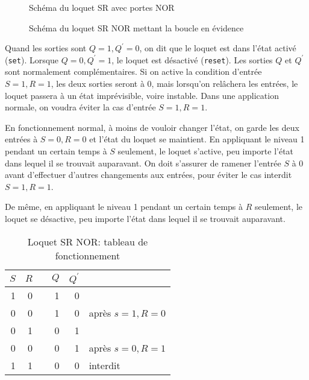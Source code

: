 \documentclass[11pt]{article}
\begin{document}
\begin{figure}[htbp]
\centering

\caption{\label{fig:orgfafe8a9}Schéma du loquet SR avec portes NOR}
\end{figure}


\begin{figure}[htbp]
\centering

\caption{\label{fig:org5976c67}Schéma du loquet SR NOR mettant la boucle en évidence}
\end{figure}

Quand les sorties sont \(Q=1, Q^\prime=0\), on dit que le loquet est
dans l'état activé (\texttt{set}). Lorsque \(Q=0, Q^\prime=1\), le loquet
est désactivé (\texttt{reset}). Les sorties \(Q\) et \(Q^\prime\) sont
normalement complémentaires. Si on active la condition d'entrée \(S=1,
R=1\), les deux sorties seront à 0, mais lorsqu'on relâchera les
entrées, le loquet passera à un état imprévisible, voire
instable. Dans une application normale, on voudra éviter la cas
d'entrée \(S=1, R=1\). 

En fonctionnement normal, à moins de vouloir changer l'état, on garde
les deux entrées à \(S=0, R=0\) et l'état du loquet se maintient. En
appliquant le niveau 1 pendant un certain temps à \(S\) seulement, le
loquet s'active, peu importe l'état dans lequel il se trouvait
auparavant. On doit s'assurer de ramener l'entrée \(S\) à 0 avant
d'effectuer d'autres changements aux entrées, pour éviter le cas
interdit \(S=1, R=1\).

De même, en appliquant le niveau 1 pendant un certain
temps à \(R\) seulement, le loquet se désactive, peu importe l'état
dans lequel il se trouvait auparavant.

\begin{table}[htbp]
\caption{\label{tab:org8b91810}Loquet SR NOR: tableau de fonctionnement}
\centering
\begin{tabular}{rrlrrl}
\(S\) & \(R\) &  & \(Q\) & \(Q^\prime\) & \\
\hline
1 & 0 &  & 1 & 0 & \\
0 & 0 &  & 1 & 0 & après \(s=1, R=0\)\\
0 & 1 &  & 0 & 1 & \\
0 & 0 &  & 0 & 1 & après \(s=0, R=1\)\\
1 & 1 &  & 0 & 0 & interdit\\
\end{tabular}
\end{table}
\end{document}
